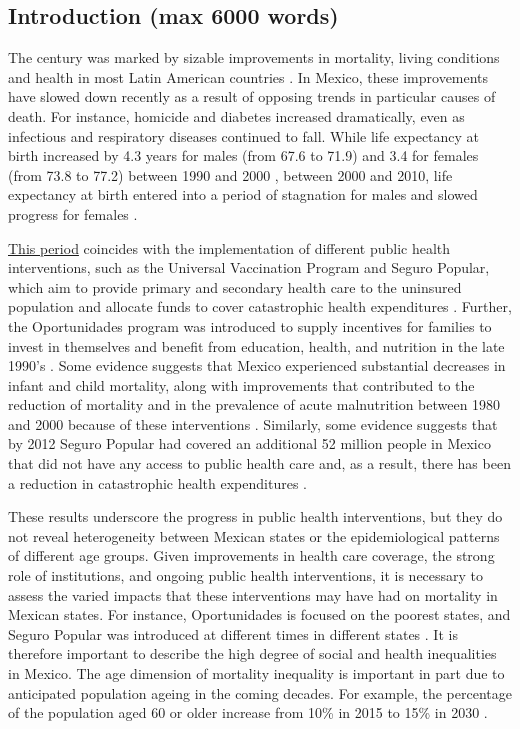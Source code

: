 \documentclass{article}
\newcommand{\un}[1]{\underline{#1}}
\begin{document}
\begin{spacing}{1.5}
\section*{Introduction (max 6000 words)}
The  century was marked by sizable improvements in mortality, living
conditions and health in most Latin American countries \citep{who2000}. 
In Mexico, these improvements have slowed down recently as a result of opposing
trends in particular causes of death. For instance, homicide and diabetes
increased dramatically, even as infectious and
respiratory diseases continued to fall. While life
expectancy at birth increased by 4.3 years for males (from 67.6 to 71.9) and 3.4
for females (from 73.8 to 77.2) between 1990 and 2000 \citep{SOMEDE},
between 2000 and 2010, life expectancy at birth entered into a period of
stagnation for males and slowed progress for females \citep{canudas2014}. 

\un{This
period} coincides with the implementation of different public health
interventions, such as the Universal Vaccination Program and Seguro
Popular, which aim to provide primary and secondary
health care to the uninsured population and allocate funds to cover catastrophic
health expenditures \citep{knaul2005}. Further, the Oportunidades program
was introduced to supply incentives for families to invest in themselves and
benefit from education, health, and nutrition in the late 1990's \citep{neufeld2012}. Some evidence
suggests that Mexico experienced substantial decreases in infant and child
mortality, along with improvements that contributed to the reduction of
mortality and in the prevalence of acute malnutrition between 1980 and 2000
because of these interventions \citep{sepulveda2006}. Similarly, some evidence
suggests that by 2012 Seguro Popular had covered an additional 52 million
people in Mexico that did not have any access to public health care and, as a result, there has been a reduction in catastrophic health expenditures \citep{knaul2012}.

 These results underscore the progress in public health interventions, but they
 do not reveal heterogeneity between Mexican states or the epidemiological patterns
 of different age groups. Given improvements in health care coverage, the strong
 role of institutions, and ongoing public health interventions, it is necessary to assess the varied
 impacts that these interventions may have had on mortality in Mexican
 states. For instance, Oportunidades is focused on the poorest
 states, and Seguro Popular was introduced at different times in different
 states \citep{Frenk2006}. It is therefore important to describe the high degree
 of social and health inequalities in Mexico. The age dimension of
 mortality inequality is important in part due to anticipated population ageing
 in the coming decades. For example, the percentage of the population aged 60 or
 older increase from 10\% in 2015 to 15\% in 2030 \citep{CONAPO}.
 

\end{spacing}
\end{document}
